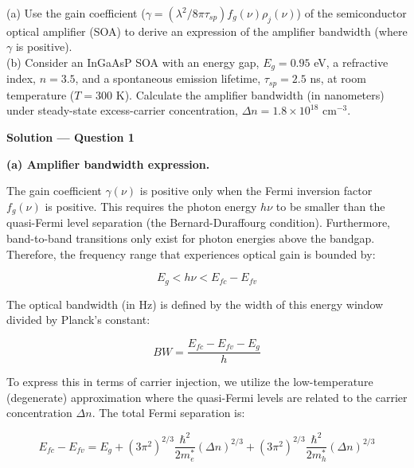 
\begin{question}[Question 1]
(a) Use the gain coefficient ($\gamma = (\lambda^2/8\pi\tau_{sp}) f_g(\nu) \rho_j(\nu)$) of the semiconductor optical amplifier (SOA) to derive an expression of the amplifier bandwidth (where $\gamma$ is positive).\\
(b) Consider an InGaAsP SOA with an energy gap, $E_g = 0.95$ eV, a refractive index, $n = 3.5$, and a spontaneous emission lifetime, $\tau_{sp} = 2.5$ ns, at room temperature ($T = 300$ K). Calculate the amplifier bandwidth (in nanometers) under steady-state excess-carrier concentration, $\Delta n = 1.8 \times 10^{18}$ cm$^{-3}$.
\end{question}

\textbf{\large Solution --- Question 1}

\textbf{(a) Amplifier bandwidth expression.}

The gain coefficient $\gamma(\nu)$ is positive only when the Fermi inversion factor $f_g(\nu)$ is positive. This requires the photon energy $h\nu$ to be smaller than the quasi-Fermi level separation (the Bernard-Duraffourg condition). Furthermore, band-to-band transitions only exist for photon energies above the bandgap. Therefore, the frequency range that experiences optical gain is bounded by:

\begin{equation*}
  E_g < h\nu < E_{fc} - E_{fv}
\end{equation*}

The optical bandwidth (in Hz) is defined by the width of this energy window divided by Planck's constant:

\begin{equation*}
  BW = \frac{E_{fc} - E_{fv} - E_g}{h}
\end{equation*}

To express this in terms of carrier injection, we utilize the low-temperature (degenerate) approximation where the quasi-Fermi levels are related to the carrier concentration $\Delta n$. The total Fermi separation is:

\begin{equation*}
  E_{fc} - E_{fv} = E_g + (3\pi^2)^{2/3} \frac{\hbar^2}{2 m_e^*} (\Delta n)^{2/3} + (3\pi^2)^{2/3} \frac{\hbar^2}{2 m_h^*} (\Delta n)^{2/3}
\end{equation*}

